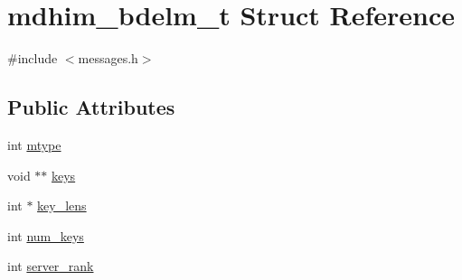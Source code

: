 \hypertarget{structmdhim__bdelm__t}{\section{mdhim\-\_\-bdelm\-\_\-t Struct Reference}
\label{d4/ddf/structmdhim__bdelm__t}
}


{\ttfamily \#include $<$messages.\-h$>$}

\subsection*{Public Attributes}
\begin{DoxyCompactItemize}
\item 
int \hyperlink{structmdhim__bdelm__t_a9723fe671281596fa43c80b13ea7eb9c}{mtype}
\item 
void $\ast$$\ast$ \hyperlink{structmdhim__bdelm__t_a7e218a41a470e47c65040491f879985d}{keys}
\item 
int $\ast$ \hyperlink{structmdhim__bdelm__t_a12057b9c3f79456910521cd628b31415}{key\-\_\-lens}
\item 
int \hyperlink{structmdhim__bdelm__t_a78c759571c75ac6472ebbd20fadbc7b4}{num\-\_\-keys}
\item 
int \hyperlink{structmdhim__bdelm__t_a5c455aeb5d7804c4d448d5b3f624c6e6}{server\-\_\-rank}
\end{DoxyCompactItemize}


